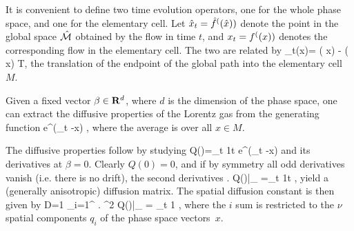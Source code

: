 \documentclass[pre,twocolumn,groupedaddress,showpacs,showkeys]{revtex4}
\begin{document}
It is convenient to define two time evolution operators, one
for the whole phase space, and one for the elementary cell.
Let $\hat x_t={\hat{f}^{(}(\hat x)})$ denote the point in
the global space $\hat {{\cal M}}$ obtained by the flow in time $t$,
and $x_t={f^{(}(x)})$ denotes the corresponding flow in
the elementary cell. The two are related by
\beq \hn_t(x)= \hflow ( x) - \flow ( x) \in T\;,\label{hatn} \eeq
the translation of the endpoint of the global path into the elementary cell $M$.

Given a fixed vector $\beta \in {\bf R}^d$, where $d$ is the dimension of the
phase space, one can extract the diffusive properties of the Lorentz gas from
the generating function
\beq \langle e^{\beta \cdot (\hx_t -x) } \rangle\;,\label{generate} \eeq
where the average is over all $x \in M$.

The diffusive properties follow by studying
\beq Q(\beta)=\lim_{t\rightarrow \infty} {1\over t} \log
    \langle e^{\beta \cdot (\hx_t -x) } \rangle \label{Q} \eeq
and its derivatives at $\beta=0$. Clearly $Q(0)=0$, and if by symmetry all odd
derivatives vanish (i.e. there is no drift), the second derivatives
\beq \left . {{\partial} }
    {{\partial} }
    Q(\beta)\right |_{} =\lim_{t\rightarrow \infty} {1\over t}
     \rangle\;, \eeq
yield a (generally anisotropic) diffusion matrix.
The spatial diffusion constant is then given by
\beq D={1\over {2 \nu}} \sum_{i=1}^{\nu} \left .
    {{\partial}^2 }
   Q(\beta)\right |_{} = \lim_{t\rightarrow \infty} {1}
    \rangle\;, \label{diffus}\eeq
where the $i$ sum is restricted to the $\nu$ spatial components $q_i$ of
the phase space vectors~$x$.
\end{document}
